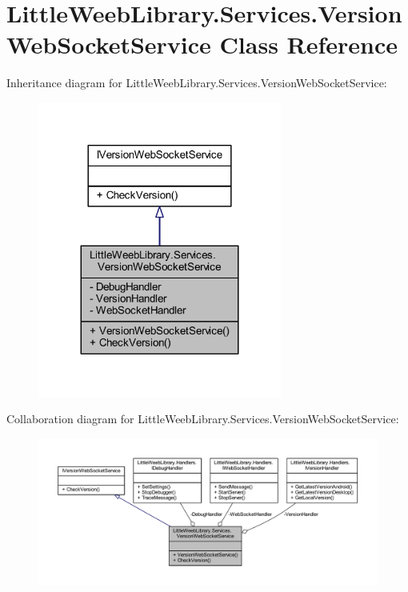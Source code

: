\hypertarget{class_little_weeb_library_1_1_services_1_1_version_web_socket_service}{}\section{Little\+Weeb\+Library.\+Services.\+Version\+Web\+Socket\+Service Class Reference}
\label{class_little_weeb_library_1_1_services_1_1_version_web_socket_service}


Inheritance diagram for Little\+Weeb\+Library.\+Services.\+Version\+Web\+Socket\+Service\+:\nopagebreak
\begin{figure}[H]
\begin{center}
\leavevmode
\includegraphics[width=227pt]{class_little_weeb_library_1_1_services_1_1_version_web_socket_service__inherit__graph}
\end{center}
\end{figure}


Collaboration diagram for Little\+Weeb\+Library.\+Services.\+Version\+Web\+Socket\+Service\+:\nopagebreak
\begin{figure}[H]
\begin{center}
\leavevmode
\includegraphics[width=350pt]{class_little_weeb_library_1_1_services_1_1_version_web_socket_service__coll__graph}
\end{center}
\end{figure}
